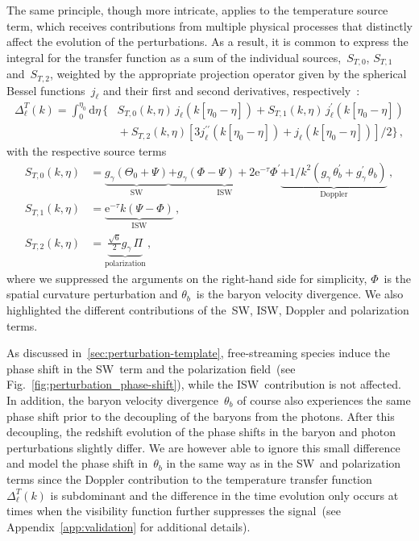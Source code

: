 \documentclass[11pt]{article}
\numberwithin{equation}{section}
\renewcommand{\d}{\mathrm{d}}
\newcommand{\ee}{\mathrm{e}}
\begin{document}
The same principle, though more intricate, applies to the temperature source term, which receives contributions from multiple physical processes that distinctly affect the evolution of the perturbations. As a result, it is common to express the integral for the transfer function as a sum of the individual sources,~$S_{T,0}$, $S_{T,1}$ and~$S_{T,2}$, weighted by the appropriate projection operator given by the spherical Bessel functions~$j_\ell$ and their first and second derivatives, respectively~\cite{Hu:1997hp}:
\begin{equation}
	\begin{split}
		\Delta^T_\ell(k) = \int_0^{\eta_0}\! \d\eta\,\bigl\{	& S_{T,0}(k,\eta)\, j_{\ell}(k[\eta_0-\eta]) + S_{T,1}(k,\eta)\, j^\prime_{\ell}(k[\eta_0-\eta])							\\
																&\!+ S_{T,2}(k,\eta) \left[3 j^{\prime\prime}_{\ell}(k[\eta_0-\eta]) + j_{\ell}(k[\eta_0-\eta])\right]\!/2 \bigr\}\, ,
	\end{split} \label{eq:transferT}
\end{equation}
with the respective source terms
\begin{align}
	S_{T,0}(k,\eta) &= \underbrace{g_\gamma\left(\Theta_0+ \Psi\right)}_{\text{SW}} \underbrace{+g_\gamma\left(\Phi-\Psi\right) +2 \ee^{-\tau} \Phi^\prime}_{\text{ISW}} \underbrace{+1/k^2\left(g_\gamma\,\theta_b^\prime+g_\gamma^\prime\,\theta_b\right)}_{\text{Doppler}}\, ,	\\[-1pt]
	S_{T,1}(k,\eta) &= \underbrace{\ee^{-\tau}k \left(\Psi-\Phi\right)}_{\text{ISW}}\, , 						\\
	S_{T,2}(k,\eta) &= \underbrace{\frac{\sqrt{6}}{2}g_\gamma\, \Pi}_{\text{polarization}}\, ,
\end{align}
where we suppressed the arguments on the right-hand side for simplicity, $\Phi$~is the spatial curvature perturbation and $\theta_b$~is the baryon velocity divergence. We also highlighted the different contributions of the~SW, ISW, Doppler and polarization terms.

As discussed in~\textsection\ref{sec:perturbation-template}, free-streaming species induce the phase shift in the SW~term and the polarization field~(see Fig.~\ref{fig:perturbation_phase-shift}), while the ISW~contribution is not affected. In addition, the baryon velocity divergence~$\theta_b$ of course also experiences the same phase shift prior to the decoupling of the baryons from the photons. After this decoupling, the redshift evolution of the phase shifts in the baryon and photon perturbations slightly differ. We are however able to ignore this small difference and model the phase shift in~$\theta_b$ in the same way as in the SW~and polarization terms since the Doppler contribution to the temperature transfer function~$\Delta^T_\ell(k)$ is subdominant and the difference in the time evolution only occurs at times when the visibility function further suppresses the signal~(see Appendix~\ref{app:validation} for additional details).\medskip
\end{document}
